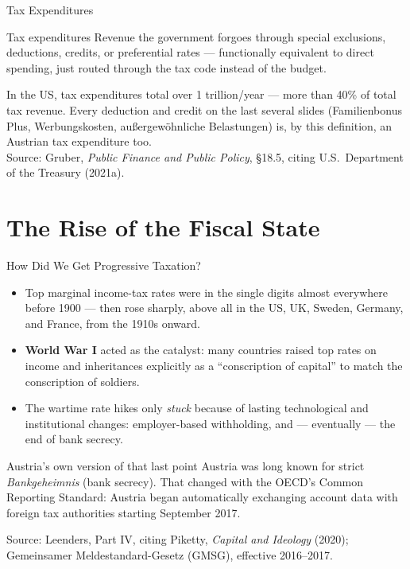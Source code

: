 \documentclass[11pt,aspectratio=169]{beamer}
\newcommand{\srcnote}[1]{{\footnotesize\color{wugray}Source: #1}}
\begin{document}
\begin{frame}{Tax Expenditures}
  \begin{block}{Tax expenditures}
    Revenue the government forgoes through special exclusions, deductions, credits, or preferential rates --- functionally equivalent to direct spending, just routed through the tax code instead of the budget.
  \end{block}
  \vspace{0.3em}
  \centering
  In the US, tax expenditures total over \texteuro{}1 trillion/year --- more than 40\% of total tax revenue. Every deduction and credit on the last several slides (Familienbonus Plus, Werbungskosten, außergewöhnliche Belastungen) is, by this definition, an Austrian tax expenditure too.\\
  \srcnote{Gruber, \emph{Public Finance and Public Policy}, \S18.5, citing U.S.\ Department of the Treasury (2021a).}
\end{frame}

\section{The Rise of the Fiscal State}

\begin{frame}{How Did We Get Progressive Taxation?}
  \small
  \begin{itemize}
    \item Top marginal income-tax rates were in the single digits almost everywhere before 1900 --- then rose sharply, above all in the US, UK, Sweden, Germany, and France, from the 1910s onward.
    \item \textbf{World War I} acted as the catalyst: many countries raised top rates on income and inheritances explicitly as a ``conscription of capital'' to match the conscription of soldiers.
    \item The wartime rate hikes only \emph{stuck} because of lasting technological and institutional changes: employer-based withholding, and --- eventually --- the end of bank secrecy.
  \end{itemize}
  \vspace{0.3em}
  \begin{alertblock}{Austria's own version of that last point}
    Austria was long known for strict \emph{Bankgeheimnis} (bank secrecy). That changed with the OECD's Common Reporting Standard: Austria began automatically exchanging account data with foreign tax authorities starting September 2017.
  \end{alertblock}
  \srcnote{Leenders, Part IV, citing Piketty, \emph{Capital and Ideology} (2020); Gemeinsamer Meldestandard-Gesetz (GMSG), effective 2016--2017.}
\end{frame}
\end{document}
